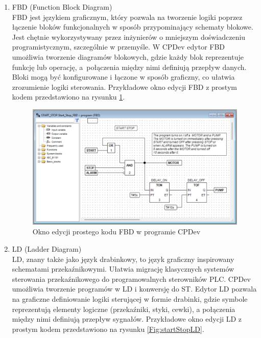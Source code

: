 \documentclass[12pt,twoside]{article}
\begin{document}
\begin{enumerate}[label=\alph*), leftmargin=1.25cm]
    \item FBD (Function Block Diagram)\\
    FBD jest językiem graficznym, który pozwala na tworzenie logiki poprzez łączenie bloków funkcjonalnych w sposób przypominający schematy blokowe. Jest chętnie wykorzystywany przez inżynierów o mniejszym doświadczeniu programistycznym, szczególnie w przemyśle. W CPDev edytor FBD umożliwia tworzenie diagramów blokowych, gdzie każdy blok reprezentuje funkcję lub operację, a~połączenia między nimi definiują przepływ danych. Bloki mogą być konfigurowane i łączone w sposób graficzny, co ułatwia zrozumienie logiki sterowania. Przykładowe okno edycji FBD z prostym kodem przedstawiono na rysunku \ref{Fig:startStopFBD}.

   \begin{figure}[ht]
   \centering
   \includegraphics[width=14cm]{images/startStopFBD.png}
   \caption{Okno edycji prostego kodu FBD w programie CPDev}
   \label{Fig:startStopFBD}
   \end{figure}

    \item LD (Ladder Diagram)\\
    LD, znany także jako język drabinkowy, to język graficzny inspirowany schematami przekaźnikowymi. Ułatwia migrację klasycznych systemów sterowania przekaźnikowego do programowalnych sterowników PLC. CPDev umożliwia tworzenie programów w LD i konwersję do ST. Edytor LD pozwala na graficzne definiowanie logiki sterującej w formie drabinki, gdzie symbole reprezentują elementy logiczne (przekaźniki, styki, cewki), a połączenia między nimi definiują przepływ sygnałów. Przykładowe okno edycji LD z prostym kodem przedstawiono na rysunku \ref{Fig:startStopLD}.


\end{enumerate}
\end{document}
